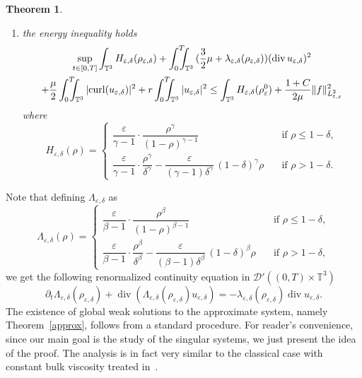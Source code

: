 \documentclass[10pt]{amsart}
\let\mathcal\mathscr
\newcommand{\<}{\bigl\langle}
\renewcommand{\>}{\bigr\rangle}
\newcommand{\intTTT}{\int_0^T\hspace*{-2.5mm}\int_{\TT}}
\newcommand{\labeleq}[1]{}
\newtheorem{thm}{Theorem}[section]
\theoremstyle{definition}
\theoremstyle{remark}
\newcommand{\TT}{\mathbb{T}^3}
\DeclareMathOperator{\curl}{curl}
\DeclareMathOperator{\Div}{div}
\let\ep\varepsilon
\begin{document}
\begin{thm}
\begin{enumerate}
\item the energy inequality holds
\begin{multline}\label{eq:energy_delta}
\sup_{t\in[0,T]} \int_{\TT} H_{\ep,\delta}(\rho_{\ep,\delta})
+ \intTTT{(\frac{3}{2}\mu+\lambda_{\ep,\delta}(\rho_{\ep,\delta}))(\Div u_{\ep,\delta})^2 }\\
+ \frac{\mu}{2} \intTTT{ |{\curl (u_{\ep,\delta})}|^2}
+ r \intTTT{ |u_{\ep,\delta}|^2}
\leq \int_{\TT}{H_{\ep,\delta}(\rho_\ep^0)} + \frac{1+C}{2\mu} \|f\|^2_{L^2_{t,x}}
\end{multline}
where
\begin{equation}\label{eq:H_delta}
H_{\ep,\delta}(\rho) =
\begin{cases}
\dfrac{\ep}{\gamma-1}\cdot \dfrac{\rho^{\gamma}}{(1-\rho)^{\gamma-1}} \quad & \text{if } \rho \leq 1-\delta, \\
\dfrac{\ep}{\gamma-1}\cdot \dfrac{\rho^\gamma}{\delta^\gamma} - \dfrac{\ep}{(\gamma - 1) \delta^{\gamma }}\,(1-\delta)^{\gamma} \rho \quad & \text{if } \rho > 1-\delta.
\end{cases}
\end{equation} 
\end{enumerate}
\end{thm}
Note that defining $\Lambda_{\ep,\delta}$ as
\begin{equation*}\labeleq{df:Lambda_delta}
\Lambda_{\ep,\delta}(\rho) =
\begin{cases}
\dfrac{\ep}{\beta-1}\cdot \dfrac{\rho^\beta}{(1-\rho)^{\beta-1}} \quad & \text{if } \rho \leq 1-\delta, \\
\dfrac{\ep}{\beta-1}\cdot \dfrac{\rho^\beta}{\delta^\beta} - \dfrac{\ep}{(\beta-1)\delta^{\beta}}\, (1-\delta)^\beta \rho \quad & \text{if } \rho > 1-\delta,
\end{cases}
\end{equation*}
we get the following renormalized continuity equation in $\mathcal{D}'((0,T)\times \TT)$
\begin{equation}\label{eq:Lambda_delta}
\partial_t \Lambda_{\ep,\delta}(\rho_{\ep,\delta}) + \Div (\Lambda_{\ep,\delta}(\rho_{\ep,\delta}) u_{\ep,\delta}) = - \lambda_{\ep,\delta}(\rho_{\ep,\delta})\Div u_{\ep,\delta}.
\end{equation}
The existence of global weak solutions to the approximate system, namely Theorem~\ref{approx}, follows from a standard procedure.
For reader's convenience, since our main goal is the study of the singular systems, we just present the idea of the proof.
The analysis is in fact very similar to the classical case with constant bulk viscosity treated in~\cite[Chap.\,8.2]{lions1998}.
\end{document}
